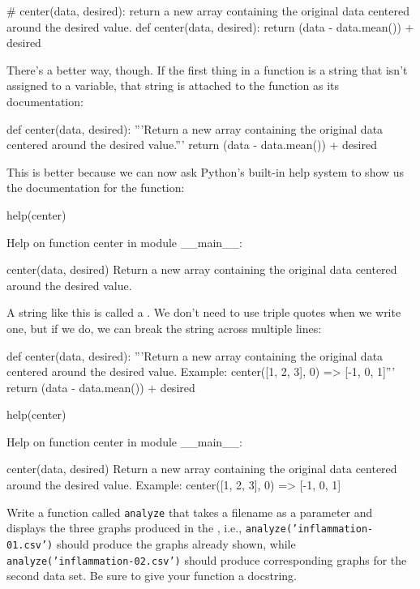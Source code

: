 \begin{VerbIn}
# center(data, desired): return a new array containing the original data centered around the desired value.
def center(data, desired):
    return (data - data.mean()) + desired
\end{VerbIn}

There's a better way, though. If the first thing in a function is a
string that isn't assigned to a variable, that string is attached to the
function as its documentation:

\begin{VerbIn}
def center(data, desired):
    '''Return a new array containing the original data centered around the desired value.'''
    return (data - data.mean()) + desired
\end{VerbIn}

This is better because we can now ask Python's built-in help system to
show us the documentation for the function:

\begin{VerbIn}
help(center)
\end{VerbIn}

\begin{VerbOut}
Help on function center in module __main__:

center(data, desired)
    Return a new array containing the original data centered around the desired value.
\end{VerbOut}

A string like this is called a . We
don't need to use triple quotes when we write one, but if we do, we can
break the string across multiple lines:

\begin{VerbIn}
def center(data, desired):
    '''Return a new array containing the original data centered around the desired value.
    Example: center([1, 2, 3], 0) => [-1, 0, 1]'''
    return (data - data.mean()) + desired

help(center)
\end{VerbIn}

\begin{VerbOut}
Help on function center in module __main__:

center(data, desired)
    Return a new array containing the original data centered around the desired value.
    Example: center([1, 2, 3], 0) => [-1, 0, 1]
\end{VerbOut}

\begin{challenge}
  Write a function called \texttt{analyze} that takes a filename as a
  parameter and displays the three graphs produced in the
  , i.e.,
  \texttt{analyze('inflammation-01.csv')} should produce the graphs
  already shown, while \texttt{analyze('inflammation-02.csv')} should
  produce corresponding graphs for the second data set. Be sure to give
  your function a docstring.
\end{challenge}

